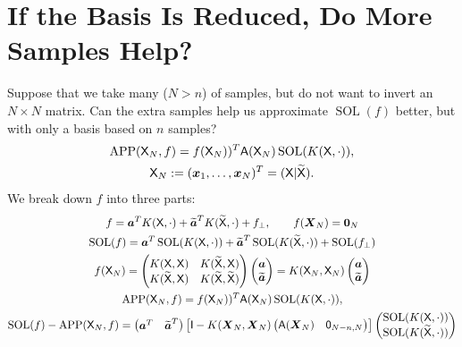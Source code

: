 \documentclass{amsart}
\DeclareMathOperator{\SOL}{SOL}
\DeclareMathOperator{\APP}{APP}
\newcommand{\tmX}{\widetilde{\mX}}
\newcommand{\tva}{\widetilde{\va}}
\begin{document}
\section{If the Basis Is Reduced, Do More Samples Help?}
Suppose that we take many ($N > n$) of samples, but do not want to invert an $N \times N$ matrix.  Can the extra samples help us approximate $\SOL(f)$ better, but with only a basis based on $n$ samples?
\begin{gather}
	\APP(\mX_N,f) =  f(\mX_N))^T \mA(\mX_N) \SOL(K(\mX,\cdot)), \\
	\mX_N := (\vx_1, \dots, \vx_N)^T = (\mX \vert \tmX).
\end{gather}
We break down $f$ into three parts:
\begin{gather*}
f =  \va^T K(\mX,\cdot) + \tva^T K(\tmX,\cdot) + f_\perp, \qquad f(\vX_N) = \vzero_N\\
\SOL(f) =  \va^T \SOL(K(\mX,\cdot)) + \tva^T \SOL( K(\tmX,\cdot))  + \SOL(f_\perp) \\
f(\mX_N) = \begin{pmatrix}
	K(\mX,\mX) & K(\tmX,\mX) \\
	K(\tmX,\mX) & K(\tmX,\tmX)
\end{pmatrix}
\begin{pmatrix} \va \\ \tva \end{pmatrix}
= K(\mX_N,\mX_N) \begin{pmatrix} \va \\ \tva \end{pmatrix}\\
	\APP(\mX_N,f) =  f(\mX_N))^T \mA(\mX_N) \SOL(K(\mX,\cdot)), \\
	\SOL(f) - \APP(\mX_N,f) = \begin{pmatrix}\va^T & \tva^T \end{pmatrix}
	\left[ \mI -  K(\vX_N,\vX_N) \begin{pmatrix} \mA(\vX_N) & \mzero_{N-n,N} \end{pmatrix} \right] \begin{pmatrix} \SOL(K(\mX,\cdot)) \\ \SOL( K(\tmX,\cdot)) \end{pmatrix}
\end{gather*}



\end{document}
